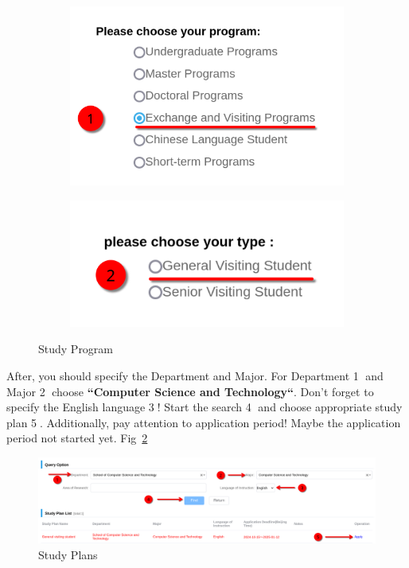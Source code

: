 \begin{figure}[htbp]
    \centering
    \begin{subfigure}[c]{0.49\textwidth}
        \centering
        \includegraphics[width=\textwidth]{russia/imgs/app_1}
    \end{subfigure}
    \hfill
    \begin{subfigure}[c]{0.49\textwidth}
        \centering
        \includegraphics[width=\textwidth]{russia/imgs/app_2}
    \end{subfigure}
    \caption{Study Program}
    \label{fig:ru_student_type}
\end{figure}


After, you should specify the Department and Major.
For Department \textcircled{1} and Major \textcircled{2} choose
\textbf{``Computer Science and Technology``}.
Don't forget to specify the English language \textcircled{3}!
Start the search \textcircled{4} and choose appropriate study plan \textcircled{5}.
Additionally, pay attention to application period!
Maybe the application period not started yet.
Fig~\ref{fig:ru_study_plan}


\begin{figure}[htpb]
    \centering
    \includegraphics[width=\textwidth]{russia/imgs/app_3_study_plan}
    \caption{\centering Study Plans}
    \label{fig:ru_study_plan}
\end{figure}








